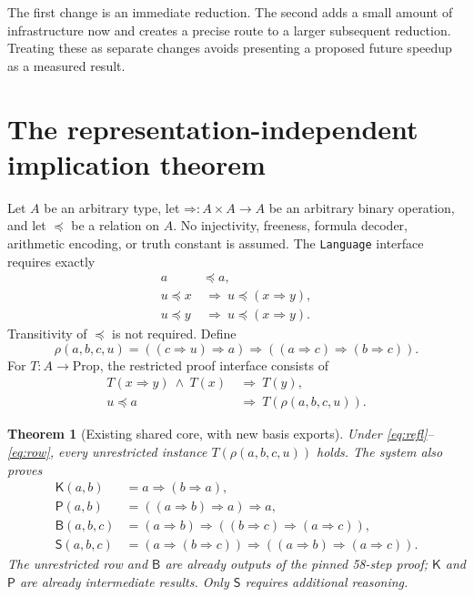 \documentclass[11pt,letterpaper]{article}
\newtheorem{theorem}{Theorem}[section]
\newcommand{\Imp}{\mathbin{\Rightarrow}}
\newcommand{\Prv}[1]{T(#1)}
\begin{document}
The first change is an immediate reduction. The second adds a small amount of
infrastructure now and creates a precise route to a larger subsequent reduction.
Treating these as separate changes avoids presenting a proposed future speedup
as a measured result.

\section{The representation-independent implication theorem}

Let $A$ be an arbitrary type, let $\Imp:A\times A\to A$ be an arbitrary binary
operation, and let $\preceq$ be a relation on $A$. No injectivity, freeness,
formula decoder, arithmetic encoding, or truth constant is assumed. The
\texttt{Language} interface requires exactly
\begin{align}
  a&\preceq a,\label{eq:refl}\\
  u\preceq x&\ \Longrightarrow\ u\preceq(x\Imp y),\label{eq:left}\\
  u\preceq y&\ \Longrightarrow\ u\preceq(x\Imp y).\label{eq:right}
\end{align}
Transitivity of $\preceq$ is not required. Define
\[
 \rho(a,b,c,u)=((c\Imp u)\Imp a)\Imp((a\Imp c)\Imp(b\Imp c)).
\]
For $T:A\to\mathrm{Prop}$, the restricted proof interface consists of
\begin{align}
 \Prv{x\Imp y}\ \wedge\ \Prv{x}&\ \Longrightarrow\ \Prv{y},\label{eq:mp}\\
 u\preceq a&\ \Longrightarrow\ \Prv{\rho(a,b,c,u)}.\label{eq:row}
\end{align}

\begin{theorem}[Existing shared core, with new basis exports]
Under \eqref{eq:refl}--\eqref{eq:row}, every unrestricted instance
$\Prv{\rho(a,b,c,u)}$ holds. The system also proves
\begin{align*}
 \mathsf K(a,b)&=a\Imp(b\Imp a),\\
 \mathsf P(a,b)&=((a\Imp b)\Imp a)\Imp a,\\
 \mathsf B(a,b,c)&=(a\Imp b)\Imp((b\Imp c)\Imp(a\Imp c)),\\
 \mathsf S(a,b,c)&=(a\Imp(b\Imp c))\Imp((a\Imp b)\Imp(a\Imp c)).
\end{align*}
The unrestricted row and $\mathsf B$ are already outputs of the pinned
58-step proof; $\mathsf K$ and $\mathsf P$ are already intermediate results.
Only $\mathsf S$ requires additional reasoning.
\end{theorem}
\end{document}
